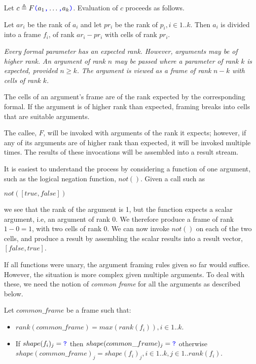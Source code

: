 \documentclass{article}
\begin{document}
Let $c \triangleq F\texttt{\color{blue} (}{}a_1\texttt{\color{blue} ,}{} \ldots\texttt{\color{blue} ,}{} a_k\texttt{\color{blue} )}$. Evaluation of $c$ proceeds as follows. 

Let $ar_i$ be the rank of $a_i$ and let $pr_i$ be the rank of $p_i, i \in 1.. k$. Then  $a_i$ is divided into a frame $f_i$, of rank $ar_i - pr_i$ with cells of rank $pr_i$. 

{\em
Every formal parameter has an expected rank. However, arguments may be of higher rank. An argument of rank $n$ may be passed where a parameter of rank $k$ is expected, provided $n \ge k$. The argument is viewed as a frame of rank $n-k$ with cells of rank $k$. 

The cells of an argument's frame are of the rank expected by the corresponding formal. If the argument is of higher rank than expected, framing breaks into cells that are suitable 
arguments.

The callee, $F$, will be invoked with arguments of the rank it expects; however, if any of its arguments are of higher rank than expected, it will be invoked multiple times.
The results of these invocations will be assembled into a result stream. 

It is easiest to understand the process by considering a function of one argument, such as the logical negation function, $not()$. Given a call such as

$not([true, false])$

we see that the rank of the argument is 1, but the function expects a scalar argument, i.e, an argument of rank 0. We therefore produce a frame of rank $1 - 0 = 1$, with two cells of rank $0$.  We can now invoke $not()$ on each of the two cells, and produce a result by assembling the scalar results into a result vector, $[false, true]$.

If all functions were unary, the argument framing rules given so far would suffice. However, the situation is more complex given multiple arguments.
To deal with these, we need the notion of {\em common frame} for all the arguments as described below.
}

Let $common\_frame$ be a frame such that:
\begin{itemize}
\item  $rank(common\_frame) = max(rank(f_i)), i \in 1 ..k$. 
\item  If $shape(f_i)_j = \texttt{\color{blue} ?}{}$ then $shape(common\_frame)_j = \texttt{\color{blue} ?}{}$ otherwise $shape(common\_frame)_j =  shape(f_i)_j,i \in 1 ..k, j \in 1..rank(f_i)$.
\end{itemize}
\end{document}
